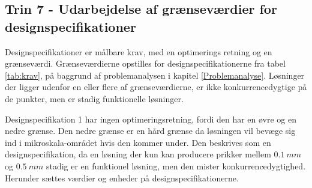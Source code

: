 \subsection{Trin 7 - Udarbejdelse af grænseværdier for designspecifikationer} \label{Trin 7} 

Designspecifikationer er målbare krav, med en optimerings retning og en grænseværdi. Grænseværdierne opstilles for designspecifikationerne fra tabel \ref{tab:krav}, på baggrund af problemanalysen i kapitel \ref{Problemanalyse}. Løsninger der ligger udenfor en eller flere af grænseværdierne, er ikke konkurrencedygtige på de punkter, men er stadig funktionelle løsninger.

Designspecifikation 1 har ingen optimeringsretning, fordi den har en øvre og en nedre grænse. Den nedre grænse er en hård grænse da løsningen vil bevæge sig ind i mikroskala-området hvis den kommer under. Den beskrives som en designspecifikation, da en løsning der kun kan producere prikker mellem \(\SI{0,1}{mm}\) og \(\SI{0,5}{mm}\) stadig er en funktionel løsning, men den mister konkurrencedygtighed. Herunder sættes værdier og enheder på designspecifikationerne.




